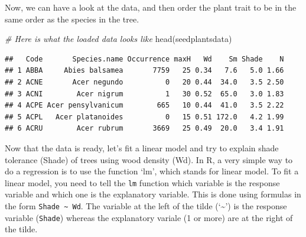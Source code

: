 \documentclass[
]{book}
\newenvironment{Shaded}{\begin{snugshade}}{\end{snugshade}}
\newcommand{\AttributeTok}[1]{\textcolor[rgb]{0.77,0.63,0.00}{#1}}
\newcommand{\CommentTok}[1]{\textcolor[rgb]{0.56,0.35,0.01}{\textit{#1}}}
\newcommand{\ConstantTok}[1]{\textcolor[rgb]{0.00,0.00,0.00}{#1}}
\newcommand{\DecValTok}[1]{\textcolor[rgb]{0.00,0.00,0.81}{#1}}
\newcommand{\FunctionTok}[1]{\textcolor[rgb]{0.00,0.00,0.00}{#1}}
\newcommand{\NormalTok}[1]{#1}
\newcommand{\OtherTok}[1]{\textcolor[rgb]{0.56,0.35,0.01}{#1}}
\newcommand{\SpecialCharTok}[1]{\textcolor[rgb]{0.00,0.00,0.00}{#1}}
\begin{document}
Now, we can have a look at the data, and then order the plant trait to be in the same order as the species in the tree.

\begin{Shaded}
\begin{Highlighting}[]
\CommentTok{\# Here is what the loaded data looks like}
\FunctionTok{head}\NormalTok{(seedplantsdata)}
\end{Highlighting}
\end{Shaded}

\begin{verbatim}
##   Code       Species.name Occurrence maxH   Wd    Sm Shade    N
## 1 ABBA     Abies balsamea       7759   25 0.34   7.6   5.0 1.66
## 2 ACNE       Acer negundo          0   20 0.44  34.0   3.5 2.50
## 3 ACNI        Acer nigrum          1   30 0.52  65.0   3.0 1.83
## 4 ACPE Acer pensylvanicum        665   10 0.44  41.0   3.5 2.22
## 5 ACPL   Acer platanoides          0   15 0.51 172.0   4.2 1.99
## 6 ACRU        Acer rubrum       3669   25 0.49  20.0   3.4 1.91
\end{verbatim}

\begin{Shaded}
\end{Shaded}

Now that the data is ready, let's fit a linear model and try to explain shade tolerance (Shade) of trees using wood density (Wd). In R, a very simple way to do a regression is to use the function `lm', which stands for linear model. To fit a linear model, you need to tell the \texttt{lm} function which variable is the response variable and which one is the explanatory variable. This is done using formulas in the form \texttt{Shade\ \textasciitilde{}\ Wd}. The variable at the left of the tilde (`\textasciitilde{}') is the response variable (\texttt{Shade}) whereas the explanatory variale (1 or more) are at the right of the tilde.
\end{document}
